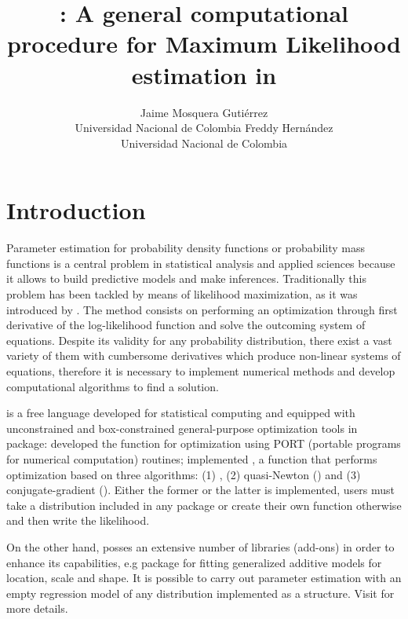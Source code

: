 \documentclass[nojss]{jss}
\author{Jaime Mosquera Guti\'errez\\Universidad Nacional de Colombia
   \And Freddy Hern\'andez\\Universidad Nacional de Colombia}
\title{\pkg{maxlogL}: A general computational procedure for Maximum Likelihood estimation in \proglang{R}}
\begin{document}


\section{Introduction} \label{sec:intro}

Parameter estimation for probability density functions or probability mass functions is a central problem in statistical analysis and applied sciences because it allows to build predictive models and make inferences. Traditionally
this problem has been tackled by means of likelihood maximization, as it was introduced by \cite{Fisher1912}. The method consists on performing an optimization through first derivative of the log-likelihood function and solve the outcoming system of equations. Despite its validity for any probability distribution, there exist a vast variety of them with cumbersome derivatives which produce non-linear systems of equations, therefore it is necessary to implement numerical methods and develop computational algorithms to find a solution.

 \citep{R2019} is a free language developed for statistical computing and equipped with unconstrained and box-constrained general-purpose optimization tools in  package: \cite{Fox1978} developed the function  for optimization using PORT (portable  programs for numerical computation) routines; \cite{Nash1979} implemented , a function that performs optimization based on three algorithms: (1) \cite{Nelder1965}, (2) quasi-Newton () and (3) conjugate-gradient (). Either the former or the latter is implemented, users must take a distribution included in any package or create their own function otherwise and then write the likelihood.

On the other hand,  posses an extensive number of libraries (add-ons) in order to enhance its capabilities, e.g   package \citep{Stasinopoulos+Rigby:2007} for fitting generalized additive models for location, scale and shape. It is possible to carry out parameter estimation with an empty regression model of any distribution implemented as a  structure. Visit \cite{Stasinopoulos2017} for more details.
\end{document}
